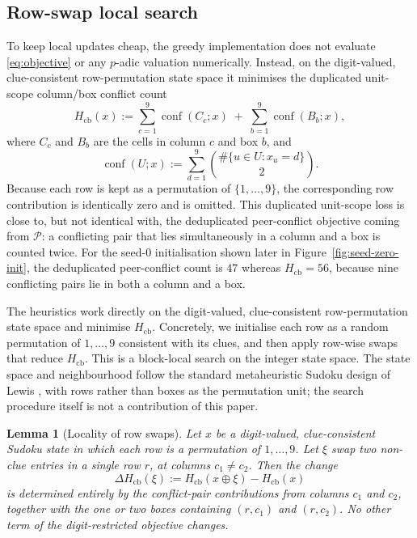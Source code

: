 \documentclass[11pt]{article}
\newtheorem{lemma}{Lemma}
\begin{document}
\subsection{Row-swap local search}
To keep local updates cheap, the greedy implementation does not evaluate \eqref{eq:objective} or any \(p\)-adic valuation numerically. Instead, on the digit-valued, clue-consistent row-permutation state space it minimises the duplicated unit-scope column/box conflict count
\[
H_{\mathrm{cb}}(x):=
\sum_{c=1}^{9} \operatorname{conf}(C_c;x)
\;+\;
\sum_{b=1}^{9} \operatorname{conf}(B_b;x),
\]
where \(C_c\) and \(B_b\) are the cells in column \(c\) and box \(b\), and
\[
\operatorname{conf}(U;x):=\sum_{d=1}^{9} \binom{\#\{u\in U:x_u=d\}}{2}.
\]
Because each row is kept as a permutation of \(\{1,\dots,9\}\), the corresponding row contribution is identically zero and is omitted. This duplicated unit-scope loss is close to, but not identical with, the deduplicated peer-conflict objective coming from \(\mathcal P\): a conflicting pair that lies simultaneously in a column and a box is counted twice. For the seed-\(0\) initialisation shown later in Figure~\ref{fig:seed-zero-init}, the deduplicated peer-conflict count is \(47\) whereas \(H_{\mathrm{cb}}=56\), because nine conflicting pairs lie in both a column and a box.

The heuristics work directly on the digit-valued, clue-consistent row-permutation state space and minimise \(H_{\mathrm{cb}}\). Concretely, we initialise each row as a random permutation of $1,\dots,9$ consistent with its clues, and then apply row-wise swaps that reduce \(H_{\mathrm{cb}}\). This is a block-local search on the integer state space. The state space and neighbourhood follow the standard metaheuristic Sudoku design of Lewis \cite{lewis2007metaheuristics}, with rows rather than boxes as the permutation unit; the search procedure itself is not a contribution of this paper.

\begin{lemma}[Locality of row swaps]
\label{lem:row-swap-locality}
Let \(x\) be a digit-valued, clue-consistent Sudoku state in which each row is a permutation of \(1,\dots,9\). Let \(\xi\) swap two non-clue entries in a single row \(r\), at columns \(c_1\neq c_2\). Then the change
\[
\Delta H_{\mathrm{cb}}(\xi):=H_{\mathrm{cb}}(x\oplus \xi)-H_{\mathrm{cb}}(x)
\]
is determined entirely by the conflict-pair contributions from columns \(c_1\) and \(c_2\), together with the one or two boxes containing \((r,c_1)\) and \((r,c_2)\). No other term of the digit-restricted objective changes.
\end{lemma}
\end{document}
